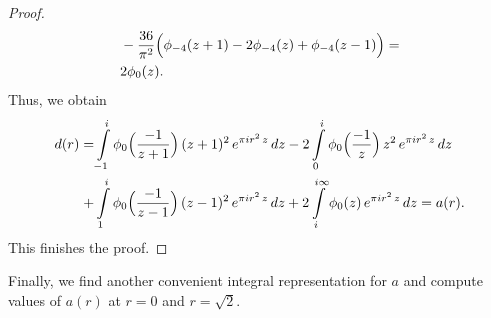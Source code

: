 \begin{proof}
\begin{align}
&-\frac{36}{\pi^2}\Big(\phi_{-4}(z+1)-2\phi_{-4}(z)+\phi_{-4}(z-1)\Big)=\notag\\
&2\phi_0(z).
\end{align}
Thus, we obtain
\begin{align}
    d(r)=&\int\limits_{-1}^{i}\phi_0\Big(\frac{-1}{z+1}\Big)\,(z+1)^2\,e^{\pi i r^2 \,z}\,dz
    -2\int\limits_{0}^{i}\phi_0\Big(\frac{-1}{z}\Big)\,z^2\,e^{\pi i r^2 \,z}\,dz\notag\\
    +&\int\limits_{1}^{i}\phi_0\Big(\frac{-1}{z-1}\Big)\,(z-1)^2\,e^{\pi i r^2 \,z}\,dz
    +2\int\limits_{i}^{i\infty}\phi_0(z)\,e^{\pi i r^2 \,z}\,dz=a(r).\notag
\end{align}
This finishes the proof.
\end{proof}

Finally, we find another convenient integral representation for $a$ and compute values of $a(r)$ at $r=0$ and $r=\sqrt{2}$.

